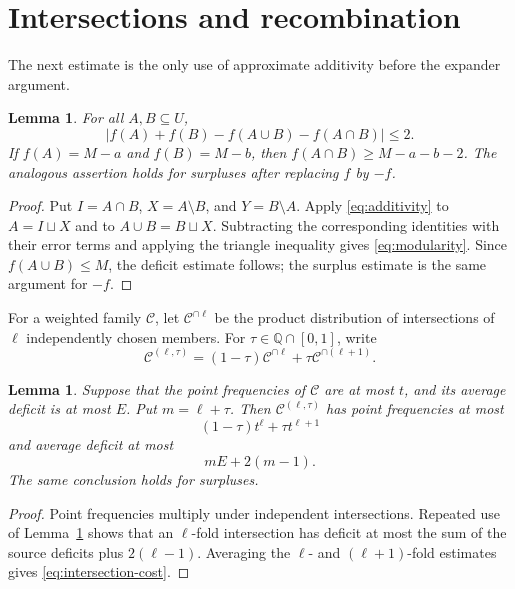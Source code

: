 \documentclass[11pt,a4paper]{amsart}
\newtheorem{lemma}[theorem]{Lemma}
\newcommand{\cC}{\mathcal C}
\begin{document}
\section{Intersections and recombination}

The next estimate is the only use of approximate additivity before the
expander argument.

\begin{lemma}\label{lem:modularity}
For all \(A,B\subseteq U\),
\begin{equation}\label{eq:modularity}
 \lvert f(A)+f(B)-f(A\cup B)-f(A\cap B)\rvert\leqslant2.
\end{equation}
If \(f(A)=M-a\) and \(f(B)=M-b\), then
\(f(A\cap B)\geqslant M-a-b-2\).  The analogous assertion holds for
surpluses after replacing \(f\) by \(-f\).
\end{lemma}

\begin{proof}
Put \(I=A\cap B\), \(X=A\setminus B\), and \(Y=B\setminus A\).  Apply
\eqref{eq:additivity} to \(A=I\sqcup X\) and to
\(A\cup B=B\sqcup X\).  Subtracting the corresponding identities with
their error terms and applying the triangle inequality gives
\eqref{eq:modularity}.  Since \(f(A\cup B)\leqslant M\), the deficit
estimate follows; the surplus estimate is the same argument for \(-f\).
\end{proof}

For a weighted family \(\cC\), let \(\cC^{\cap\ell}\) be the product
distribution of intersections of \(\ell\) independently chosen members.  For
\(\tau\in\mathbb Q\cap[0,1]\), write
\[
 \cC^{(\ell,\tau)}
 =(1-\tau)\cC^{\cap\ell}+\tau\cC^{\cap(\ell+1)}.
\]

\begin{lemma}\label{lem:intersections}
Suppose that the point frequencies of \(\cC\) are at most \(t\), and its
average deficit is at most \(E\).  Put \(m=\ell+\tau\).  Then
\(\cC^{(\ell,\tau)}\) has point frequencies at most
\begin{equation}\label{eq:intersection-frequency}
        (1-\tau)t^\ell+\tau t^{\ell+1}
\end{equation}
and average deficit at most
\begin{equation}\label{eq:intersection-cost}
        mE+2(m-1).
\end{equation}
The same conclusion holds for surpluses.
\end{lemma}

\begin{proof}
Point frequencies multiply under independent intersections.  Repeated use of
Lemma~\ref{lem:modularity} shows that an \(\ell\)-fold intersection has deficit
at most the sum of the source deficits plus \(2(\ell-1)\).  Averaging the
\(\ell\)- and \((\ell+1)\)-fold estimates gives
\eqref{eq:intersection-cost}.
\end{proof}
\end{document}

